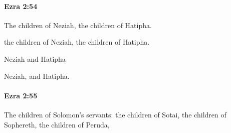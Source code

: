 		\paragraph{Ezra 2:54} %
			\label{EZRA-2-54}

			The children of Neziah, the children of Hatipha.

			\begin{versebox}
					\item[BHS] 
					\item[LXX] 
					\item[ASV] the children of Neziah, the children of Hatipha.
					\item[NIV] Neziah and Hatipha
					\item[NRSV] Neziah, and Hatipha.
			\end{versebox}

		\paragraph{Ezra 2:55} %
			\label{EZRA-2-55}

			The children of Solomon’s servants: the children of Sotai, the children of Sophereth, the children of Peruda,

